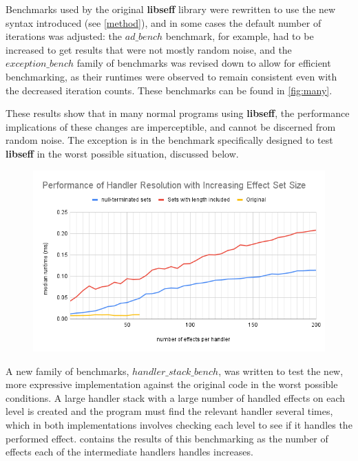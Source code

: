 \documentclass[logo,bsc,singlespacing,parskip,online]{infthesis}
\begin{document}
Benchmarks used by the original \textbf{libseff} library were rewritten to use the new syntax introduced (see \cref{method}), and in some cases the default number of iterations was adjusted: the $ad\_bench$ benchmark, for example, had to be increased to get results that were not mostly random noise, and the $exception\_bench$ family of benchmarks was revised down to allow for efficient benchmarking, as their runtimes were observed to remain consistent even with the decreased iteration counts. These benchmarks can be found in \cref{fig:many}.

These results show that in many normal programs using \textbf{libseff}, the performance implications of these changes are imperceptible, and cannot be discerned from random noise. The exception is in the benchmark specifically designed to test \textbf{libseff} in the worst possible situation, discussed below.

\begin{figure}[ht]
    \centering
    \includegraphics[width=\linewidth]{width_parametrized_performance.png}
    \caption{}
    \label{fig:adjusted}
\end{figure}

A new family of benchmarks, $handler\_stack\_bench$, was written to test the new, more expressive implementation against the original code in the worst possible conditions. A large handler stack with a large number of handled effects on each level is created and the program must find the relevant handler several times, which in both implementations involves checking each level to see if it handles the performed effect.  contains the results of this benchmarking as the number of effects each of the intermediate handlers handles increases.
\end{document}
